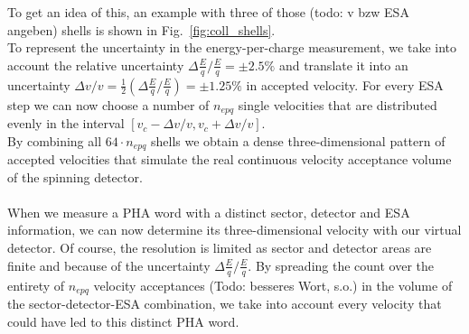 To get an idea of this, an example with three of those (todo: v bzw ESA angeben) shells is shown in Fig.~\ref{fig:coll_shells}.\\
To represent the uncertainty in the energy-per-charge measurement, we take into account the relative uncertainty $\Delta \frac{E}{q}/\frac{E}{q} = \pm 2.5\%$ \citep{gloeckler_1992} and translate it into an uncertainty $\Delta v / v = \frac{1}{2} \left( \Delta \frac{E}{q}/\frac{E}{q}\right) = \pm 1.25\%$ in accepted velocity. For every ESA step we can now choose a number of $n_{epq}$ single velocities that are distributed evenly in the interval $\left[ v_c - \Delta v / v, v_c + \Delta v / v \right]$. %
\\
By combining all $64 \cdot n_{epq}$ shells we obtain a dense three-dimensional pattern of accepted velocities that simulate the real continuous velocity acceptance volume of the spinning detector.
\\ \\
When we measure a PHA word with a distinct sector, detector and ESA information, we can now determine its three-dimensional velocity with our virtual detector. Of course, the resolution is limited as sector and detector areas are finite and because of the uncertainty $\Delta \frac{E}{q}/\frac{E}{q}$. By spreading the count over the entirety of $n_{epq}$ velocity acceptances (Todo: besseres Wort, s.o.) in the volume of the sector-detector-ESA combination, we take into account every velocity that could have led to this distinct PHA word.
%
%
%
